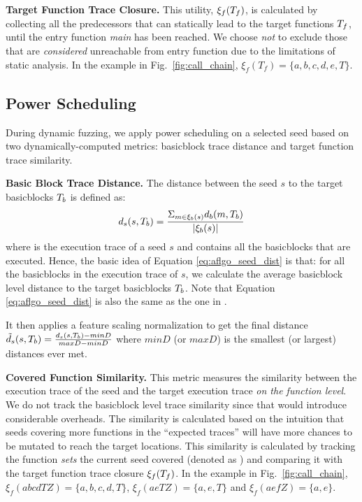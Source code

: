 \textbf{Target Function Trace Closure.} This utility, $\xi_f(T_f)$,  is calculated by collecting all the predecessors that can statically lead to the target functions $T_f$, until the entry function \emph{main} has been reached. We choose \emph{not} to exclude those that are \emph{considered} unreachable from entry function due to the limitations of static analysis. In the example in Fig.~\ref{fig:call_chain}, $\xi_f(T_f)=\{a,b,c,d,e,T\}$.




\subsection{Power Scheduling}  \label{subsec:powerSche}

During dynamic fuzzing, we apply power scheduling on a selected seed based on two dynamically-computed metrics: basicblock trace distance and target function trace similarity.

\textbf{Basic Block Trace Distance.} The distance between the seed $s$ to the target basicblocks $T_b$ is defined as:
\begin{equation}
d_s(s,T_b) = \frac{\Sigma_{m\in\xi_b(s)}d_b(m, T_b)}{|\xi_b(s)|}
\label{eq:aflgo_seed_dist}
\end{equation}
where  is the execution trace of a seed $s$ and contains all the basicblocks that are executed. Hence, the basic idea of Equation  \ref{eq:aflgo_seed_dist} is that: for all the basicblocks in the  execution trace of $s$, we calculate the average basicblock level distance to the target basicblocks  $T_b$.  Note that Equation \ref{eq:aflgo_seed_dist} is also the same as the one in \aflgo \cite{Bohme:2017:DGF}.

It then applies a feature scaling normalization to get the final distance $\tilde{d}_s(s,T_b)=\frac{d_s(s,T_b)-minD}{maxD-minD}$ where $minD$ (or $maxD$) is the smallest (or largest) distances ever met.


\textbf{Covered Function Similarity.} This metric measures the similarity between the execution trace of the seed and the target execution trace \emph{on the function level}. We do not track the basicblock level trace similarity since that would introduce considerable overheads. The similarity is calculated based on the intuition that seeds covering more functions in the ``expected traces'' will have more chances to be mutated to reach the target locations. This similarity is calculated by tracking the function \emph{sets} the current seed covered (denoted as ) and comparing it with the target function trace closure $\xi_f(T_f)$.  In the example in Fig.~\ref{fig:call_chain}, $\xi_f(abcdTZ)=\{a,b,c,d,T\}$, $\xi_f(aeTZ)=\{a,e,T\}$ and $\xi_f(aefZ)=\{a,e\}$.

